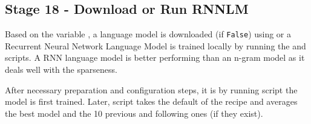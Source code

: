 \subsection{ Stage 18 - Download or Run RNNLM}
Based on the variable , a language model is downloaded (if \texttt{False}) using  or a Recurrent Neural Network Language Model is trained locally by running the 
 and  scripts. A RNN language model is better performing than an n-gram model as it deals well with the sparseness. 

After necessary preparation and configuration steps, it is by running  script the model is first trained. Later,  script takes the default  of the recipe and averages the best model and the 10 previous and following ones (if they exist).
